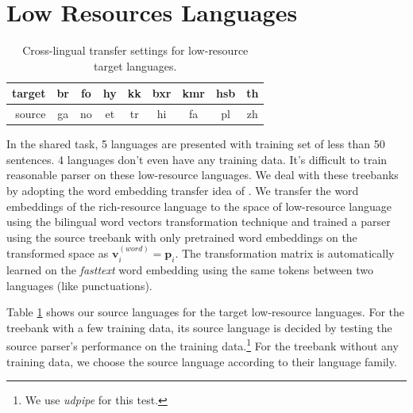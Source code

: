 \documentclass[11pt,a4paper]{article}
\begin{document}
%
%


%
%

\section{Low Resources Languages}\label{sec:low}
\begin{table}[t]
	\centering
	\small
	\begin{tabular}{r|cccccccc}
		target & br & fo & hy & kk & bxr & kmr & hsb & th \\
		\hline
		source & ga & no & et & tr &  hi & fa & pl & zh \\
	\end{tabular}
\caption{Cross-lingual transfer settings for low-resource target languages.}\label{tbl:low-res-trans}
\end{table}

In the shared task, 5 languages are presented with training set of less than 50 sentences.
4 languages don't even have any training data.
It's difficult to train reasonable parser on these low-resource languages.
We deal with these treebanks by adopting the word embedding transfer idea 
of \citet{guo-EtAl:2015:ACL-IJCNLP2}.
We transfer the word embeddings of the rich-resource language
to the space of low-resource language using the bilingual word vectors transformation technique
\cite{DBLP:journals/corr/SmithTHH17}
and trained a parser using the source treebank
with only pretrained word embeddings on the transformed space
as $\mathbf{v}_i^{(word)} = \mathbf{p}_i$.
The transformation matrix is automatically learned on the \textit{fasttext} word embedding
using the same tokens between two languages (like punctuations).

Table \ref{tbl:low-res-trans} shows our source languages for the target low-resource languages.
For the treebank with a few training data, its  source language is decided by
testing the source parser's performance on the training data.\footnote{We use \textit{udpipe} for this test.}
For the treebank without any training data, we choose the source language according to their language family.
\end{document}
